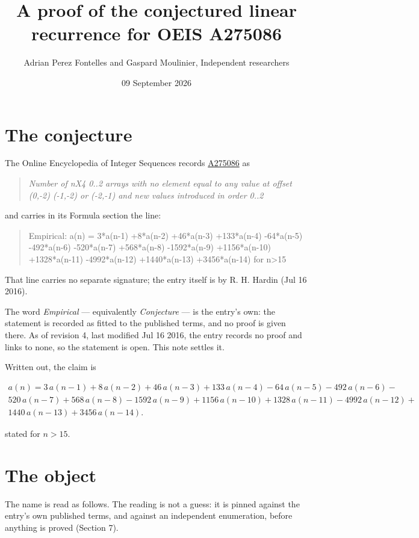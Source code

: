 \documentclass[11pt]{article}
\title{A proof of the conjectured linear recurrence for OEIS A275086}
\author{Adrian Perez Fontelles and Gaspard Moulinier, Independent researchers}
\date{09 September 2026}
\theoremstyle{definition}
\begin{document}
\maketitle
\section{The conjecture}

The Online Encyclopedia of Integer Sequences records \href{https://oeis.org/A275086}{A275086} as

\begin{quote}\itshape Number of nX4 0..2 arrays with no element equal to any value at offset (0,-2) (-1,-2) or (-2,-1) and new values introduced in order 0..2\end{quote}

and carries in its Formula section the line:

\begin{quote}\ttfamily Empirical: a(n) = 3*a(n-1) +8*a(n-2) +46*a(n-3) +133*a(n-4) -64*a(n-5) -492*a(n-6) -520*a(n-7) +568*a(n-8) -1592*a(n-9) +1156*a(n-10) +1328*a(n-11) -4992*a(n-12) +1440*a(n-13) +3456*a(n-14) for n>15\end{quote}

That line carries no separate signature; the entry itself is by R. H. Hardin (Jul 16 2016).

The word {\itshape Empirical} --- equivalently {\itshape Conjecture} --- is the entry's own: the statement is recorded as fitted to the published terms, and no proof is given there. As of revision 4, last modified Jul 16 2016, the entry records no proof and links to none, so the statement is open. This note settles it.

Written out, the claim is

\begin{multline*} a(n) = 3\,a(n-1) + 8\,a(n-2) + 46\,a(n-3) + 133\,a(n-4) - 64\,a(n-5) - 492\,a(n-6) - \\ 520\,a(n-7) + 568\,a(n-8) - 1592\,a(n-9) + 1156\,a(n-10) + 1328\,a(n-11) - 4992\,a(n-12) + \\ 1440\,a(n-13) + 3456\,a(n-14). \end{multline*}

stated for $n > 15$.

\section{The object}

The name is read as follows. The reading is not a guess: it is pinned against the entry's own published terms, and against an independent enumeration, before anything is proved (Section 7).
\end{document}
